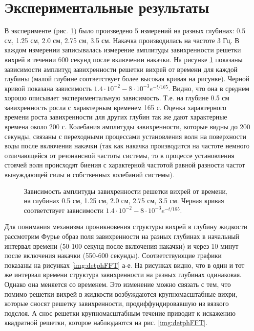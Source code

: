 \section{Экспериментальные результаты} \label{sect6_3}

В эксперименте (рис. \ref{img:5deeps}) было произведено 5 измерений на разных глубинах: 0.5 см, 1.25 см, 2.0 см, 2.75 см, 3.5 см. Накачка производилась на частоте 3 Гц. В каждом измерении записывалась измерение амплитуды завихренности решетки вихрей в течении 600 секунд после включении накачки. На рисунке \ref{img:5deeps} показаны зависимости амплитуд завихренности решетки вихрей от времени для каждой глубины (малой глубине соответствует более высокая кривая на рисунке). Черной кривой показана зависимость $1.4 \cdot 10^{-2} - 8 \cdot 10^{-3} e^{-t/165}$. Видно, что она в среднем хорошо описывает экспериментальную зависимость. Т.е. на глубине 0.5 см завихренность росла с характерным временем 165 с. Оценка характерного времени роста завихренности для других глубин так же дают характерные времена около 200 с. Колебания амплитуды завихренности, которые видны до 200 секунды, связаны с переходными процессами установления волн на поверхности воды после включения накачки (так как накачка производится на частоте немного отличающейся от резонансной частоты системы, то в процессе установления стоячей волн происходят биения с характерной частотой равной разности частот вынуждающей силы и собственных колебаний системы).

\begin{figure}[ht]
 \caption{Зависимость амплитуды завихренности решетки вихрей от времени, на глубинах 0.5 см, 1.25 см, 2.0 см, 2.75 см, 3.5 см. Черная кривая соответствует зависимости $1.4 \cdot 10^{-2} - 8 \cdot 10^{-3} e^{-t/165}$.}
 \label{img:5deeps} 
\end{figure}

Для понимания механизма проникновения структуры вихрей в глубину жидкости рассмотрим Фурье образ поля завихренности на разных глубинах в начальный интервал времени (50-100 секунд после включения накачки) и через 10 минут после включения накачки (550-600 секунды). Соответствующие графики показаны на рисунках \ref{img:detphFFT} а-е. На рисунках видно, что в один и тот же интервал времени структура завихренности на разных глубинах одинаковая. Однако она меняется со временем. Это изменение можно связать с тем, что помимо решетки вихрей в жидкости возбуждаются крупномасштабные вихри, которые сносят решетку завихренности, продиффундировавшую из вязкого подслоя. А снос решетки крупномасштабным течение приводит к искажению квадратной решетки, которое наблюдаются на рис. \ref{img:detphFFT}.

